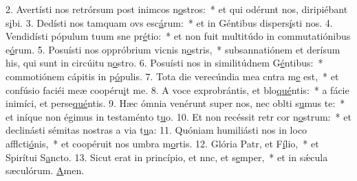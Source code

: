2. Avertísti nos retrórsum post inimcos n\uline{o}stros:~* et qui odérunt nos, diripiébant s\uline{i}bi.
3. Dedísti nos tamquam ovs esc\uline{á}rum:~* et in Géntibus dispers\uline{í}sti nos.
4. Vendidísti pópulum tuum sne pr\uline{é}tio:~* et non fuit multitúdo in commutatiónibus e\uline{ó}rum.
5. Posuísti nos oppróbrium vicnis n\uline{o}stris,~* subsannatiónem et derísum his, qui sunt in circúitu n\uline{o}stro.
6. Posuísti nos in similitúdnem G\uline{é}ntibus:~* commotiónem cápitis in p\uline{ó}pulis.
7. Tota die verecúndia mea cntra m\uline{e} est,~* et confúsio faciéi meæ coopéru\uline{i}t me.
8. A voce exprobrántis, et blo\uline{qué}ntis:~* a fácie inimíci, et perse\uline{qué}ntis.
9. Hæc ómnia venérunt super nos, nec oblti s\uline{u}mus te:~* et iníque non égimus in testaménto t\uline{u}o.
10. Et non recéssit retr cor n\uline{o}strum:~* et declinásti sémitas nostras a via t\uline{u}a:
11. Quóniam humiliásti nos in loco afflcti\uline{ó}nis,~* et coopéruit nos umbra m\uline{o}rtis.
12. Glória Patr, et F\uline{í}lio,~* et Spirítui S\uline{a}ncto.
13. Sicut erat in princípio, et nnc, et s\uline{e}mper,~* et in sǽcula sæculórum. \uline{A}men.
